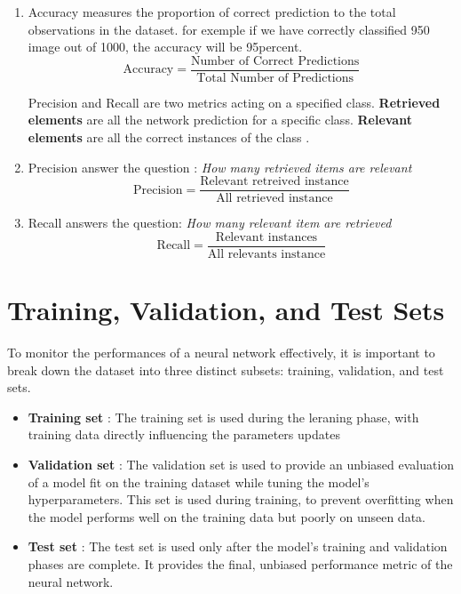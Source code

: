 \documentclass[a4paper, twocolumn, twoside]{article}
\begin{document}
	\begin{enumerate}
		\item Accuracy measures the proportion of correct prediction to the total observations in the dataset.
		for exemple if we have correctly classified 950 image out of 1000, the accuracy will be 95percent.
		$$
		\text{Accuracy} = \frac{\text{Number of Correct Predictions}}{\text{Total Number of Predictions}}
		$$

		Precision and Recall are two metrics acting on a specified class.
		\textbf{Retrieved elements} are all the network prediction for a specific class.
		\textbf{Relevant elements} are all the correct instances of 
		the class \cite{wiki_precision_recall}.

		\item Precision answer the question : \textit{How many retrieved items are relevant}
		$$
		\text{Precision} = \frac{\text{Relevant retreived instance}}{\text{All retrieved instance}}
		$$
		\item Recall answers the question: \textit{How many relevant item are retrieved}
		$$
		\text{Recall} = \frac{\text{Relevant instances}}{\text{All relevants instance}}
		$$
	\end{enumerate}

	\section{Training, Validation, and Test Sets}
	To monitor the performances of a neural network effectively,
	it is important to break down the dataset into three distinct subsets:
	training, validation, and test sets.

	\begin{itemize}
\item{\textbf{Training set}} : The training set is used during the leraning phase,
	with training data directly influencing the parameters updates
\item{\textbf{Validation set}} : The validation set is used to provide an unbiased evaluation of a model fit
	on the training dataset while tuning the model's hyperparameters.
	This set is used during training, to prevent overfitting when the model performs well on the training data
	but poorly on unseen data.
\item{\textbf{Test set}} :	The test set is used only after the model's training and validation phases are complete.
	It provides the final, unbiased performance metric of the neural network.
	\end{itemize}
\end{document}
